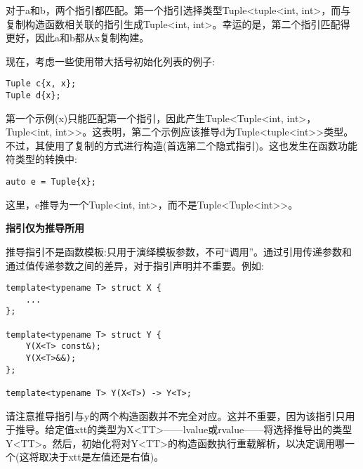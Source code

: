 对于a和b，两个指引都匹配。第一个指引选择类型Tuple<tuple<int, int>，而与复制构造函数相关联的指引生成Tuple<int, int>。幸运的是，第二个指引匹配得更好，因此a和b都从x复制构建。

现在，考虑一些使用带大括号初始化列表的例子:

\begin{lstlisting}[style=styleCXX]
Tuple c{x, x};
Tuple d{x};
\end{lstlisting}

第一个示例(x)只能匹配第一个指引，因此产生Tuple<Tuple<int, int>，Tuple<int, int>{}>。这表明，第二个示例应该推导d为Tuple<tuple<int>{}>类型。不过，其使用了复制的方式进行构造(首选第二个隐式指引)。这也发生在函数功能符类型的转换中:

\begin{lstlisting}[style=styleCXX]
auto e = Tuple{x};
\end{lstlisting}

这里，e推导为一个Tuple<int, int>，而不是Tuple<Tuple<int>{}>。

\noindent
\textbf{指引仅为推导所用}

推导指引不是函数模板:只用于演绎模板参数，不可“调用”。通过引用传递参数和通过值传递参数之间的差异，对于指引声明并不重要。例如:

\begin{lstlisting}[style=styleCXX]
template<typename T> struct X {
	...
};

template<typename T> struct Y {
	Y(X<T> const&);
	Y(X<T>&&);
};

template<typename T> Y(X<T>) -> Y<T>;
\end{lstlisting}

请注意推导指引与y的两个构造函数并不完全对应。这并不重要，因为该指引只用于推导。给定值xtt的类型为X<TT>——lvalue或rvalue——将选择推导出的类型Y<TT>。然后，初始化将对Y<TT>的构造函数执行重载解析，以决定调用哪一个(这将取决于xtt是左值还是右值)。





